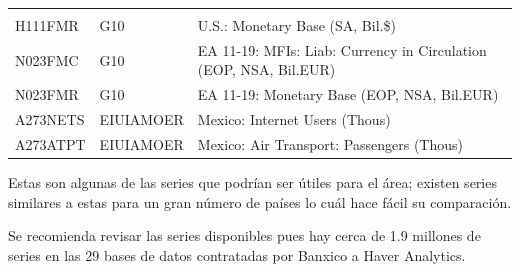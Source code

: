 \documentclass[
]{book}
\begin{document}
\begin{longtable}[]{@{}lll@{}}
\begin{minipage}[t]{0.41\columnwidth}
\end{minipage}\tabularnewline
\begin{minipage}[t]{0.20\columnwidth}\raggedright
H111FMR\strut
\end{minipage} & \begin{minipage}[t]{0.30\columnwidth}\raggedright
G10\strut
\end{minipage} & \begin{minipage}[t]{0.41\columnwidth}\raggedright
U.S.: Monetary Base (SA, Bil.\$)\strut
\end{minipage}\tabularnewline
\begin{minipage}[t]{0.20\columnwidth}\raggedright
N023FMC\strut
\end{minipage} & \begin{minipage}[t]{0.30\columnwidth}\raggedright
G10\strut
\end{minipage} & \begin{minipage}[t]{0.41\columnwidth}\raggedright
EA 11-19: MFIs: Liab: Currency in Circulation (EOP, NSA, Bil.EUR)\strut
\end{minipage}\tabularnewline
\begin{minipage}[t]{0.20\columnwidth}\raggedright
N023FMR\strut
\end{minipage} & \begin{minipage}[t]{0.30\columnwidth}\raggedright
G10\strut
\end{minipage} & \begin{minipage}[t]{0.41\columnwidth}\raggedright
EA 11-19: Monetary Base (EOP, NSA, Bil.EUR)\strut
\end{minipage}\tabularnewline
\begin{minipage}[t]{0.20\columnwidth}\raggedright
A273NETS\strut
\end{minipage} & \begin{minipage}[t]{0.30\columnwidth}\raggedright
EIUIAMOER\strut
\end{minipage} & \begin{minipage}[t]{0.41\columnwidth}\raggedright
Mexico: Internet Users (Thous)\strut
\end{minipage}\tabularnewline
\begin{minipage}[t]{0.20\columnwidth}\raggedright
A273ATPT\strut
\end{minipage} & \begin{minipage}[t]{0.30\columnwidth}\raggedright
EIUIAMOER\strut
\end{minipage} & \begin{minipage}[t]{0.41\columnwidth}\raggedright
Mexico: Air Transport: Passengers (Thous)\strut
\end{minipage}\tabularnewline
\bottomrule
\end{longtable}

Estas son algunas de las series que podrían ser útiles para el área; existen series similares a estas para un gran número de países lo cuál hace fácil su comparación.

Se recomienda revisar las series disponibles pues hay cerca de 1.9 millones de series en las 29 bases de datos contratadas por Banxico a Haver Analytics.

  
\end{document}
